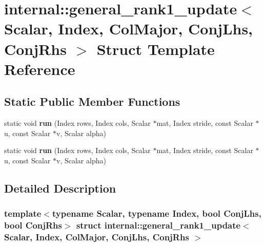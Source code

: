 \hypertarget{structinternal_1_1general__rank1__update_3_01_scalar_00_01_index_00_01_col_major_00_01_conj_lhs_00_01_conj_rhs_01_4}{}\section{internal\+:\+:general\+\_\+rank1\+\_\+update$<$ Scalar, Index, Col\+Major, Conj\+Lhs, Conj\+Rhs $>$ Struct Template Reference}
\label{structinternal_1_1general__rank1__update_3_01_scalar_00_01_index_00_01_col_major_00_01_conj_lhs_00_01_conj_rhs_01_4}
\subsection*{Static Public Member Functions}
\begin{DoxyCompactItemize}
\item 
\mbox{\label{structinternal_1_1general__rank1__update_3_01_scalar_00_01_index_00_01_col_major_00_01_conj_lhs_00_01_conj_rhs_01_4_a1e1a6e2d22b13aedbbb73ae276318e26}} 
static void {\bfseries run} (Index rows, Index cols, Scalar $\ast$mat, Index stride, const Scalar $\ast$u, const Scalar $\ast$v, Scalar alpha)
\item 
\mbox{\label{structinternal_1_1general__rank1__update_3_01_scalar_00_01_index_00_01_col_major_00_01_conj_lhs_00_01_conj_rhs_01_4_a1e1a6e2d22b13aedbbb73ae276318e26}} 
static void {\bfseries run} (Index rows, Index cols, Scalar $\ast$mat, Index stride, const Scalar $\ast$u, const Scalar $\ast$v, Scalar alpha)
\end{DoxyCompactItemize}


\subsection{Detailed Description}
\subsubsection*{template$<$typename Scalar, typename Index, bool Conj\+Lhs, bool Conj\+Rhs$>$\newline
struct internal\+::general\+\_\+rank1\+\_\+update$<$ Scalar, Index, Col\+Major, Conj\+Lhs, Conj\+Rhs $>$}



